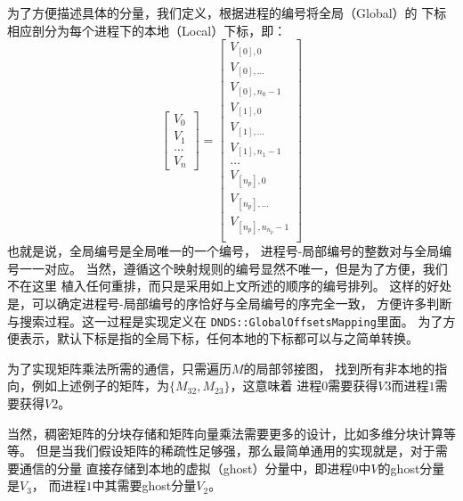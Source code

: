 \documentclass[UTF8,zihao=5]{ctexart} %
\begin{document}
为了方便描述具体的分量，我们定义，根据进程的编号将全局（Global）的
下标相应剖分为每个进程下的本地（Local）下标，即：
\begin{equation*}
    \begin{bmatrix}
        V_0 \\V_1\\\dots\\V_{n}
    \end{bmatrix} = \begin{bmatrix}
        V_{[0],0}             \\
        V_{[0],\dots}         \\
        V_{[0],n_0-1}         \\
        V_{[1],0}             \\
        V_{[1],\dots}         \\
        V_{[1],n_1-1}         \\
        \dots                 \\
        V_{[{n_p}],0}         \\
        V_{[{n_p}],\dots}     \\
        V_{[{n_p}],n_{n_p}-1} \\
    \end{bmatrix}
\end{equation*}
也就是说，全局编号是全局唯一的一个编号，
进程号-局部编号的整数对与全局编号一一对应。
当然，遵循这个映射规则的编号显然不唯一，但是为了方便，我们不在这里
植入任何重排，而只是采用如上文所述的顺序的编号排列。
这样的好处是，可以确定进程号-局部编号的序恰好与全局编号的序完全一致，
方便许多判断与搜索过程。这一过程是实现定义在
\verb|DNDS::GlobalOffsetsMapping|里面。
为了方便表示，默认下标是指的全局下标，任何本地的下标都可以与之简单转换。

为了实现矩阵乘法所需的通信，只需遍历$M$的局部邻接图，
找到所有非本地的指向，例如上述例子的矩阵，为$\{M_{32},M_{23}\}$，这意味着
进程$0$需要获得$V{3}$而进程$1$需要获得$V{2}$。

当然，稠密矩阵的分块存储和矩阵向量乘法需要更多的设计，比如多维分块计算等等。
但是当我们假设矩阵的稀疏性足够强，那么最简单通用的实现就是，对于需要通信的分量
直接存储到本地的虚拟（ghost）分量中，即进程$0$中$V$的ghost分量是$V_3$，
而进程$1$中其需要ghost分量$V_2$。
\end{document}
